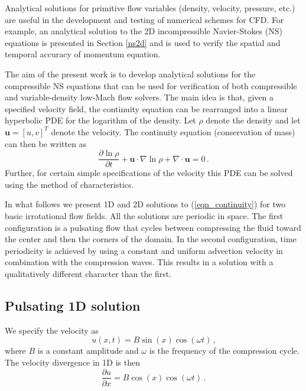 \documentclass[11pt]{book}
\begin{document}
Analytical solutions for primitive flow variables (density, velocity, pressure, etc.) are useful in the development and testing of numerical schemes for CFD.  For example, an analytical solution to the 2D incompressible Navier-Stokes (NS) equations is presented in Section \ref{ns2d} and is used to verify the spatial and temporal accuracy of momentum equation.

The aim of the present work is to develop analytical solutions for the compressible NS equations that can be used for verification of both compressible and variable-density low-Mach flow solvers.  The main idea is that, given a specified velocity field, the continuity equation can be rearranged into a linear hyperbolic PDE for the logarithm of the density.  Let $\rho$ denote the density and let $\mathbf{u} = [u,v]^T$ denote the velocity. The continuity equation (conservation of mass) can then be written as
\begin{equation}
\label{eqn_continuity}
\frac{\partial \ln \rho}{\partial t} + \mathbf{u} \cdot \nabla \ln \rho + \nabla\cdot \mathbf{u} = 0 \,\mbox{.}
\end{equation}
Further, for certain simple specifications of the velocity this PDE can be solved using the method of characteristics.

In what follows we present 1D and 2D solutions to (\ref{eqn_continuity}) for two basic irrotational flow fields.  All the solutions are periodic in space.  The first configuration is a pulsating flow that cycles between compressing the fluid toward the center and then the corners of the domain.  In the second configuration, time periodicity is achieved by using a constant and uniform advection velocity in combination with the compression waves.  This results in a solution with a qualitatively different character than the first.

\subsection{Pulsating 1D solution}
\label{soln_1d}

We specify the velocity as
\begin{equation}
\label{eqn_velocity1d}
u(x,t)  = B \sin(x) \cos(\omega t) \,\mbox{,}
\end{equation}
where $B$ is a constant amplitude and $\omega$ is the frequency of the compression cycle. The velocity divergence in 1D is then
\begin{equation}
\label{eqn_pdesource1d}
\frac{\partial u}{\partial x} = B \cos(x) \cos(\omega t) \,\mbox{.}
\end{equation}
\end{document}
